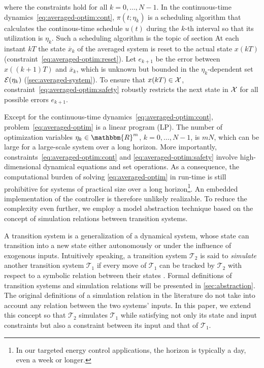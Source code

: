 where the constraints hold for all $k = 0, \ldots, N - 1$.
In the continuous-time dynamics~\eqref{eq:averaged-optim:cont}, $\pi (t ; \eta_k)$ is a scheduling algorithm that calculates the continous-time schedule $u (t)$ during the $k$-th interval so that
its utilization is $\eta_k$.
Such a scheduling algorithm is the topic of section 
At each instant $kT$ the state $\overbar{x}_{k}$ of the averaged system is reset to the actual state $x (kT)$ (constraint~\eqref{eq:averaged-optim:reset}).
Let $e_{k+1}$ be the error between $x((k+1)T)$ and $\overbar{x}_{k}$, which is unknown but bounded in the $\eta_k$-dependent set $\mathcal{E}(\eta_{k})$ (\cf \cref{sec:averaged-system}).
To ensure that $x (k T) \in \mathcal{X}$, constraint~\eqref{eq:averaged-optim:safety} robustly restricts the next state in $\mathcal{X}$ for all possible errors $e_{k+1}$.

Except for the continuous-time dynamics~\eqref{eq:averaged-optim:cont}, problem~\eqref{eq:averaged-optim} is a linear program (LP).
The number of optimization variables $\eta_k \in \mathbbm{R}^m$, $k = 0, \ldots, N - 1$, is $mN$, which can be large for a large-scale system over a long horizon.
More importantly, constraints~\eqref{eq:averaged-optim:cont} and \eqref{eq:averaged-optim:safety} involve high-dimensional dynamical
equations and set operations.
As a consequence, the computational burden of solving \eqref{eq:averaged-optim} in run-time
is still prohibitive for systems of practical size over a long horizon\footnote{In our targeted energy control applications, the horizon is typically a day, even a week or longer.}.
An embedded implementation of the controller is therefore unlikely realizable.
To reduce the complexity even further, we employ a model abstraction technique based on the concept of simulation relations between transition systems.

A transition system is a generalization of a dynamical system, whose state can
transition into a new state either autonomously or under the influence of
exogenous inputs.
Intuitively speaking, a transition system $\mathcal{T}_2$ is said to {\emph{simulate}} another
transition system $\mathcal{T}_1$ if every move of $\mathcal{T}_1$ can be
tracked by $\mathcal{T}_2$ with respect to a symbolic relation between their states \cite{girardetal07amd}.
Formal definitions of transition systems and simulation relations will
be presented in \cref{sec:abstraction}. The original definitions of a
simulation relation in the literature do not take into account %
any relation between the two systems' inputs.
In this paper, we extend this concept so that $\mathcal{T}_2$ simulates
$\mathcal{T}_1$ while satisfying not only its state and input constraints but also a constraint between its input and that of $\mathcal{T}_1$.

